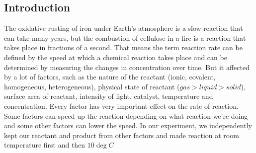 \documentclass[a4paper, 12pt]{article}%
\begin{document}
\begin{center}
    \section{Introduction}
\end{center}
The oxidative rusting of iron under Earth's atmosphere is a slow reaction that can take many years, but the combustion of cellulose in a fire is a reaction that takes place in fractions of a second. That means the term reaction rate can be defined by the speed at which a chemical reaction takes place and can be determined by measuring the changes in concentration over time. But it affected by a lot of factors, such as the nature of the reactant (ionic, covalent, homogeneous, heterogeneous), physical state of reactant ($gas>liquid>solid$), surface area of reactant, intensity of light, catalyst, temperature and concentration. Every factor has very important effect on the rate of reaction. Some factors can speed up the reaction depending on what reaction we're doing and some other factors can lower the speed. In our experiment, we independently kept our reactant and product from other factors and made reaction at room temperature first and then $10 \deg C$
\end{document}
